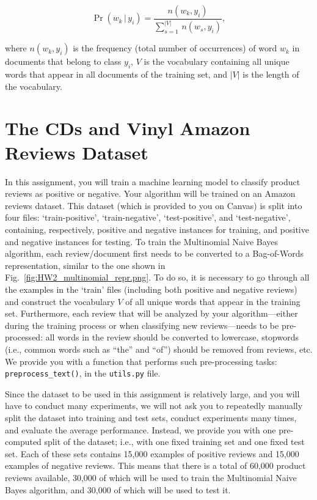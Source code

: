 \documentclass[letterpaper]{article}
\begin{document}
\begin{equation}
   \Pr(w_k \, | \, y_i) = \frac{n(w_k, y_i)}{\sum_{s=1}^{|V|} \, n(w_s, y_i)},
\end{equation}

\noindent where $n(w_k, y_i)$ is the frequency (total number of occurrences) of word $w_k$ in documents that belong to class $y_i$, $V$ is the vocabulary containing all unique words that appear in all documents of the training set, and $|V|$ is the length of the vocabulary.

\section{The CDs and Vinyl Amazon Reviews Dataset}

In this assignment, you will train a machine learning model to classify product reviews as positive or negative. Your algorithm will be trained on an Amazon reviews dataset. This dataset (which is provided to you on Canvas) is split into four files: ‘train-positive’, ‘train-negative’, ‘test-positive’, and ‘test-negative’, containing, respectively, positive and negative instances for training, and positive and negative instances for testing. To train the Multinomial Naive Bayes algorithm, each review/document first needs to be converted to a Bag-of-Words representation, similar to the one shown in Fig.~\ref{fig:HW2_multinomial_repr.png}. To do so, it is necessary to go through all the examples in the ‘train’ files (including both positive and negative reviews) and construct the vocabulary $V$ of all unique words that appear in the training set. Furthermore, each review that will be analyzed by your algorithm---either during the training process or when classifying new reviews---needs to be pre-processed: all words in the review should be converted to lowercase, stopwords (i.e., common words such as ``the'' and ``of'') should be removed from reviews, etc. We provide you with a function that performs such pre-processing tasks: \texttt{preprocess\_text()}, in the \texttt{utils.py} file. 

Since the dataset to be used in this assignment is relatively large, and you will have to conduct many experiments, we will not ask you to repeatedly manually split the dataset into training and test sets, conduct experiments many times, and evaluate the average performance. Instead, we provide you with one pre-computed split of the dataset; i.e., with one fixed training set and one fixed test set. Each of these sets contains 15,000 examples of positive reviews and 15,000 examples of negative reviews. This means that there is a total of 60,000 product reviews available, 30,000 of which will be used to train the Multinomial Naive Bayes algorithm, and 30,000 of which will be used to test it.
\end{document}
